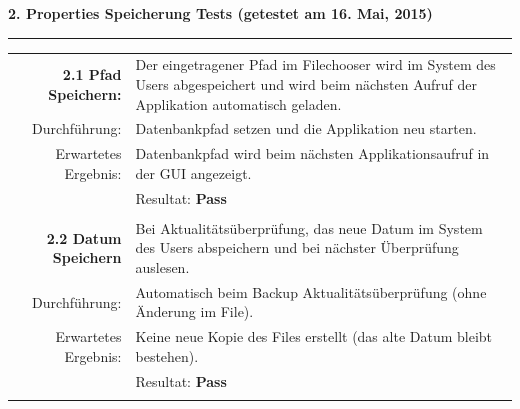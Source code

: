 \documentclass{article}
\begin{document}
\textbf{2. Properties Speicherung Tests (getestet am 16. Mai, 2015)\\}
\rule[2mm]{1\linewidth}{0.3mm}
\begin{tabular}{r|p{12cm}}
	\textbf{2.1 Pfad Speichern:} & Der eingetragener Pfad im Filechooser wird im System des Users abgespeichert und wird beim nächsten Aufruf der Applikation automatisch geladen.\\
	Durchführung:			& Datenbankpfad setzen und die Applikation neu starten.\\
	Erwartetes Ergebnis: 	& Datenbankpfad wird beim nächsten Applikationsaufruf in der GUI angezeigt. \\
	& Resultat:  \textbf{Pass}\hspace{9cm} \color{green} {\ding{51}} \\
	\\	
	
	\textbf{2.2 Datum Speichern } & Bei Aktualitätsüberprüfung, das neue Datum im System des Users abspeichern und bei nächster Überprüfung auslesen. \\
	Durchführung:			& Automatisch beim Backup Aktualitätsüberprüfung (ohne Änderung im File).\\
	Erwartetes Ergebnis: 	& Keine neue Kopie des Files erstellt (das alte Datum bleibt bestehen). \\
	& Resultat:  \textbf{Pass}\hspace{9cm} \color{green} {\ding{51}} \\
	\\	
\end{tabular}

\newpage
\end{document}
